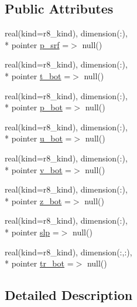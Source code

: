 \subsection*{Public Attributes}
\begin{DoxyCompactItemize}
\item 
real(kind=r8\-\_\-kind), dimension(\-:), \\*
pointer \hyperlink{structdycore__typedefs_1_1dycore__coupling__type_a8bdc2008232e57dff5cf7382c500f02e}{p\-\_\-srf} =$>$ null()
\item 
real(kind=r8\-\_\-kind), dimension(\-:), \\*
pointer \hyperlink{structdycore__typedefs_1_1dycore__coupling__type_a35bdfaa15f9d5b7b151ae2804bb52149}{t\-\_\-bot} =$>$ null()
\item 
real(kind=r8\-\_\-kind), dimension(\-:), \\*
pointer \hyperlink{structdycore__typedefs_1_1dycore__coupling__type_a4eb475b9dab3982917db471bf4bee05e}{p\-\_\-bot} =$>$ null()
\item 
real(kind=r8\-\_\-kind), dimension(\-:), \\*
pointer \hyperlink{structdycore__typedefs_1_1dycore__coupling__type_a0f1e2c519ff3fb826527fc759f4dcf62}{u\-\_\-bot} =$>$ null()
\item 
real(kind=r8\-\_\-kind), dimension(\-:), \\*
pointer \hyperlink{structdycore__typedefs_1_1dycore__coupling__type_a1cc41e534da5330112d86bee76a8f185}{v\-\_\-bot} =$>$ null()
\item 
real(kind=r8\-\_\-kind), dimension(\-:), \\*
pointer \hyperlink{structdycore__typedefs_1_1dycore__coupling__type_a92cc02abdb31595b5e42e1e76ebc4943}{z\-\_\-bot} =$>$ null()
\item 
real(kind=r8\-\_\-kind), dimension(\-:), \\*
pointer \hyperlink{structdycore__typedefs_1_1dycore__coupling__type_ac11a4dc51ade2f678aa2511deaa0695a}{slp} =$>$ null()
\item 
real(kind=r8\-\_\-kind), dimension(\-:,\-:), \\*
pointer \hyperlink{structdycore__typedefs_1_1dycore__coupling__type_ac058ed0372a4f29cd443088d91bf5214}{tr\-\_\-bot} =$>$ null()
\end{DoxyCompactItemize}


\subsection{Detailed Description}


